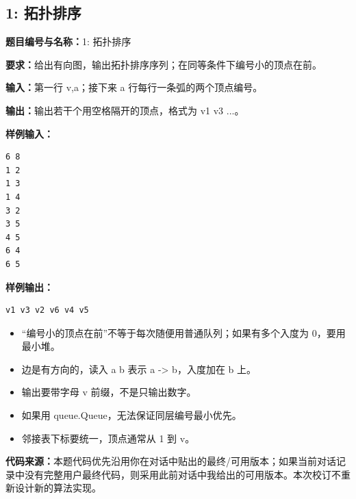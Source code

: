 \documentclass[10pt,a4paper,fontset=none]{ctexart}
\newcommand{\codesource}{\par\noindent\textbf{代码来源：}本题代码优先沿用你在对话中贴出的最终/可用版本；如果当前对话记录中没有完整用户最终代码，则采用此前对话中我给出的可用版本。本次校订不重新设计新的算法实现。\par\vspace{0.2em}}
\begin{document}
\subsection{1: 拓扑排序}
\begin{taskbox}
\textbf{题目编号与名称：}1: 拓扑排序\par
\textbf{要求：}给出有向图，输出拓扑排序序列；在同等条件下编号小的顶点在前。\par
\textbf{输入：}第一行 v,a；接下来 a 行每行一条弧的两个顶点编号。\par
\textbf{输出：}输出若干个用空格隔开的顶点，格式为 v1 v3 ...。\par
\textbf{样例输入：}
\begin{lstlisting}[style=sample]
6 8
1 2
1 3
1 4
3 2
3 5
4 5
6 4
6 5
\end{lstlisting}
\textbf{样例输出：}
\begin{lstlisting}[style=sample]
v1 v3 v2 v6 v4 v5
\end{lstlisting}
\end{taskbox}
\begin{mistakebox}
\begin{itemize}
  \item “编号小的顶点在前”不等于每次随便用普通队列；如果有多个入度为 0，要用最小堆。
  \item 边是有方向的，读入 a b 表示 a -> b，入度加在 b 上。
  \item 输出要带字母 v 前缀，不是只输出数字。
  \item 如果用 queue.Queue，无法保证同层编号最小优先。
  \item 邻接表下标要统一，顶点通常从 1 到 v。
\end{itemize}
\end{mistakebox}
\codesource
\end{document}

